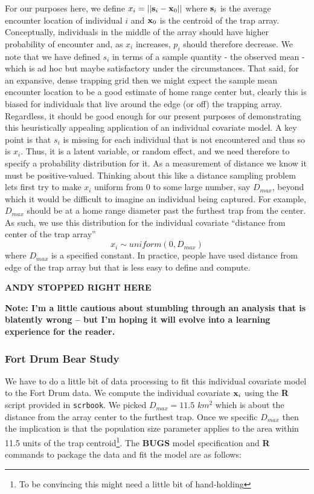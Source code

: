 For our purposes here, we define $x_{i} = ||{\bf s}_{i} - {\bf
  x}_{0}||$ where ${\bf s}_{i}$
is the average encounter location of individual $i$ and ${\bf x}_{0}$ is the
centroid of the trap array.  Conceptually, individuals in the middle
of the array should have higher probability of encounter and, as
$x_{i}$ increases, $p_{i}$ should therefore decrease. We note that we
have defined $s_{i}$ in terms of a sample quantity - the observed mean
- which is ad hoc but maybe satisfactory under the circumstances. That
said, for
an expansive, dense trapping grid then we might expect the sample mean
encounter location to be a good estimate of home range center but,
clearly this is biased for individuals that live around the edge (or
off) the trapping array. Regardless, it should be good enough for our
present purposes of demonstrating this heuristically appealing
application of an individual covariate model. A key point is that
$s_{i}$ is missing for each individual that is not encountered and
thus so is $x_{i}$. Thus,
it is a latent variable, or random effect, and we need therefore to
specify a probability distribution for it.
As a measurement of distance we know it must be
positive-valued. Thinking about this like a distance sampling problem
lets first try to make $x_{i}$ uniform from $0$ to some large number,
say $D_{max}$, beyond which it would be difficult to imagine an
individual being captured. For example, $D_{max}$ should be at a home
range diameter past the furthest trap from the center.
As such, we use this distribution for the individual covariate
``distance from center of the trap array''
\[
 x_{i} \sim uniform(0,D_{max})
\]
where $D_{max}$ is a specified constant.  In practice, people have
used distance from edge of the trap array but that is less easy to
define and compute.

{\bf ANDY STOPPED RIGHT HERE}

{\bf Note: I'm a little cautious about stumbling through an analysis
  that is blatently wrong -- but I'm hoping it will evolve into a
  learning experience for the reader.}


\subsubsection{Fort Drum Bear Study}

We have to do a little bit of data processing to fit this individual
covariate model to the Fort Drum data. 
We compute the individual covariate ${\bf x}_{i}$ using the {\bf R} script
provided in \mbox{\tt scrbook}.
We picked $D_{max} = 11.5$ $km^2$ which is about the distance from the
array center to the furthest trap. 
Once we specific $D_{max}$ then the implication is that the population
size parameter applies to the area 
within 11.5 units of the trap centroid\footnote{To be convincing
  this might  need a little bit of hand-holding}. The {\bf BUGS} model
specification and {\bf R} commands to package the data and fit the model are
as follows:

